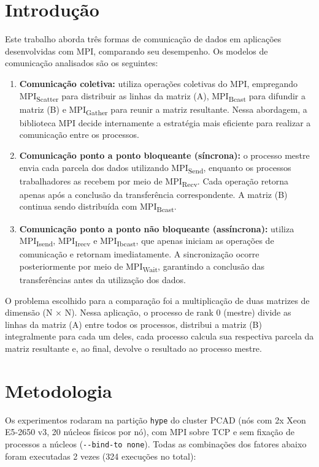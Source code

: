 \section{Introdução}\label{introduuxe7uxe3o}

Este trabalho aborda três formas de comunicação de dados em aplicações
desenvolvidas com MPI, comparando seu desempenho. Os modelos de
comunicação analisados são os seguintes:

\begin{enumerate}
\tightlist
\item
  \textbf{Comunicação coletiva:} utiliza operações coletivas do MPI,
  empregando MPI\textsubscript{Scatter} para distribuir as linhas da
  matriz (A), MPI\textsubscript{Bcast} para difundir a matriz (B) e
  MPI\textsubscript{Gather} para reunir a matriz resultante. Nessa
  abordagem, a biblioteca MPI decide internamente a estratégia mais
  eficiente para realizar a comunicação entre os processos.
\item
  \textbf{Comunicação ponto a ponto bloqueante (síncrona):} o processo
  mestre envia cada parcela dos dados utilizando
  MPI\textsubscript{Send}, enquanto os processos trabalhadores as
  recebem por meio de MPI\textsubscript{Recv}. Cada operação retorna
  apenas após a conclusão da transferência correspondente. A matriz (B)
  continua sendo distribuída com MPI\textsubscript{Bcast}.
\item
  \textbf{Comunicação ponto a ponto não bloqueante (assíncrona):}
  utiliza MPI\textsubscript{Isend}, MPI\textsubscript{Irecv} e
  MPI\textsubscript{Ibcast}, que apenas iniciam as operações de
  comunicação e retornam imediatamente. A sincronização ocorre
  posteriormente por meio de MPI\textsubscript{Wait}, garantindo a
  conclusão das transferências antes da utilização dos dados.
\end{enumerate}

O problema escolhido para a comparação foi a multiplicação de duas
matrizes de dimensão (N × N). Nessa aplicação, o processo de rank 0
(mestre) divide as linhas da matriz (A) entre todos os processos,
distribui a matriz (B) integralmente para cada um deles, cada processo
calcula sua respectiva parcela da matriz resultante e, ao final, devolve
o resultado ao processo mestre.

\section{Metodologia}\label{metodologia}

Os experimentos rodaram na partição \texttt{hype} do cluster PCAD (nós
com 2x Xeon E5-2650 v3, 20 núcleos físicos por nó), com MPI sobre TCP e
sem fixação de processos a núcleos (\texttt{-\/-bind-to\ none}). Todas
as combinações dos fatores abaixo foram executadas 2 vezes (324
execuções no total):

